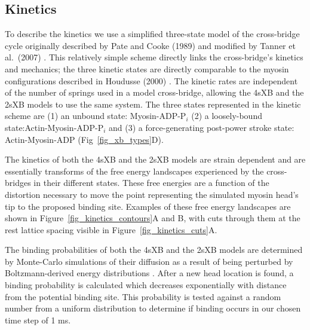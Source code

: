 \documentclass[10pt]{article}
\newcommand{\citep}[1]{\cite{#1}} %
\begin{document}
\subsection*{Kinetics} %

To describe the kinetics we use a simplified three-state model of the cross-bridge cycle originally described by Pate and Cooke (1989) \citep{Pate1989} and modified by Tanner et al.~(2007) \citep{Tanner2007}. 
This relatively simple scheme directly links the cross-bridge's kinetics and mechanics; the three kinetic states are directly comparable to the myosin configurations described in Houdusse (2000) \citep{Houdusse2000}. 
The kinetic rates are independent of the number of springs used in a model cross-bridge, allowing the 4sXB and the 2sXB models to use the same system. 
The three states represented in the kinetic scheme are (1) an unbound state: Myosin-ADP-P$_i$ (2) a loosely-bound state:Actin-Myosin-ADP-P$_i$ and (3) a force-generating post-power stroke state: Actin-Myosin-ADP (Fig~\ref{fig_xb_types}D).

The kinetics of both the 4sXB and the 2sXB models are strain dependent and are essentially transforms of the free energy landscapes experienced by the cross-bridges in their different states.
These free energies are a function of the distortion necessary to move the point representing the simulated myosin head's tip to the proposed binding site. 
Examples of these free energy landscapes are shown in Figure~\ref{fig_kinetics_contours}A and B, with cuts through them at the rest lattice spacing visible in Figure~\ref{fig_kinetics_cuts}A.

The binding probabilities of both the 4sXB and the 2sXB models are determined by Monte-Carlo simulations of their diffusion as a result of being perturbed by Boltzmann-derived energy distributions \citep{DillBook}. 
After a new head location is found, a binding probability is calculated which decreases exponentially with distance from the potential binding site. 
This probability is tested against a random number from a uniform distribution to determine if binding occurs in our chosen time step of 1 ms.
\end{document}
